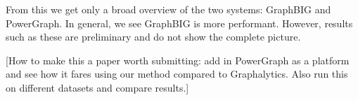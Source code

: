 \documentclass{llncs}
\begin{document}
From this we get only a broad overview of the two systems: GraphBIG and PowerGraph. In general, we see GraphBIG is more performant. However, results such as these are preliminary and do not show the complete picture.

[How to make this a paper worth submitting: add in PowerGraph as a platform and see how it fares using our method compared to Graphalytics. Also run this on different datasets and compare results.]



\begin{table}
		\centering
	\caption{Performance results are in milliseconds. LCC is local clustering coefficient, PR is PageRank, CDLP is community detection using label propagation, and WCC is weakly connected components}
	\label{tab:graphalytics}
\end{table}
\end{document}
